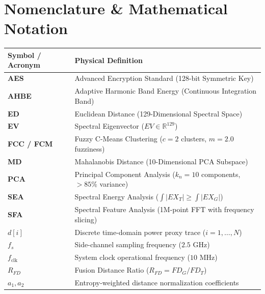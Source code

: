 \documentclass[11pt,a4paper,oneside]{book}
\begin{document}
\vspace{1.5em}

\section*{Nomenclature \& Mathematical Notation}
\begin{table}[h!]
\centering
\small
\begin{tabularx}{\textwidth}{l X}
\toprule
\textbf{Symbol / Acronym} & \textbf{Physical Definition} \\
\midrule
\textbf{AES} & Advanced Encryption Standard (128-bit Symmetric Key) \\
\textbf{AHBE} & Adaptive Harmonic Band Energy (Continuous Integration Band) \\
\textbf{ED} & Euclidean Distance (129-Dimensional Spectral Space) \\
\textbf{EV} & Spectral Eigenvector ($EV \in \mathbb{R}^{129}$) \\
\textbf{FCC / FCM} & Fuzzy C-Means Clustering ($c=2$ clusters, $m=2.0$ fuzziness) \\
\textbf{MD} & Mahalanobis Distance (10-Dimensional PCA Subspace) \\
\textbf{PCA} & Principal Component Analysis ($k_n=10$ components, $>85\%$ variance) \\
\textbf{SEA} & Spectral Energy Analysis ($\int |EX_T| \ge \int |EX_G|$) \\
\textbf{SFA} & Spectral Feature Analysis (1M-point FFT with frequency slicing) \\
$d[i]$ & Discrete time-domain power proxy trace ($i = 1, \dots, N$) \\
$f_s$ & Side-channel sampling frequency ($2.5\text{ GHz}$) \\
$f_{\text{clk}}$ & System clock operational frequency ($10\text{ MHz}$) \\
$R_{FD}$ & Fusion Distance Ratio ($R_{FD} = FD_G / FD_T$) \\
$a_1, a_2$ & Entropy-weighted distance normalization coefficients \\
\bottomrule
\end{tabularx}
\end{table}

\tableofcontents
\listoffigures
\listoftables

\mainmatter
\end{document}
